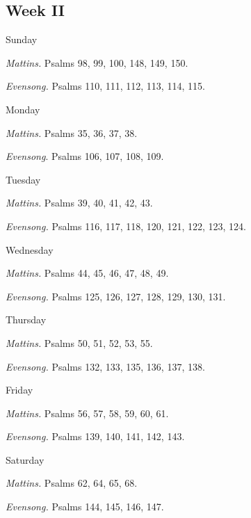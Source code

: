 \begin{paracol}{2}
\begin{leftcolumn}
	\end{leftcolumn}
	\begin{rightcolumn}
		\subsection{Week II}
		\begin{inhead}
			Sunday
		\end{inhead}\par\noindent
		\textit{Mattins.} Psalms 98, 99, 100, 148, 149, 150.\par\noindent
		\textit{Evensong.} Psalms 110, 111, 112, 113, 114, 115.\par
		\begin{inhead}
			Monday
		\end{inhead}\par\noindent
		\textit{Mattins.} Psalms 35, 36, 37, 38.\par\noindent
		\textit{Evensong}. Psalms 106, 107, 108, 109.\par
		\begin{inhead}
			Tuesday
		\end{inhead}\par\noindent
		\textit{Mattins.} Psalms 39, 40, 41, 42, 43.\par\noindent
		\textit{Evensong.} Psalms 116, 117, 118, 120, 121, 122, 123, 124.\par
		\begin{inhead}
			Wednesday
		\end{inhead}\par\noindent
		\textit{Mattins.} Psalms 44, 45, 46, 47, 48, 49.\par\noindent
		\textit{Evensong.} Psalms 125, 126, 127, 128, 129, 130, 131.\par
		\begin{inhead}
			Thursday
		\end{inhead}\par\noindent
		\textit{Mattins.} Psalms 50, 51, 52, 53, 55.\par\noindent
		\textit{Evensong.} Psalms 132, 133, 135, 136, 137, 138.\par
		\begin{inhead}
			Friday
		\end{inhead}\par\noindent
		\textit{Mattins.} Psalms 56, 57, 58, 59, 60, 61.\par\noindent
		\textit{Evensong.} Psalms 139, 140, 141, 142, 143.\par
		\begin{inhead}
			Saturday
		\end{inhead}\par\noindent
		\textit{Mattins.} Psalms 62, 64, 65, 68.\par\noindent
		\textit{Evensong.} Psalms 144, 145, 146, 147.\par
	\end{rightcolumn}
	\switchcolumn*
\end{paracol}
